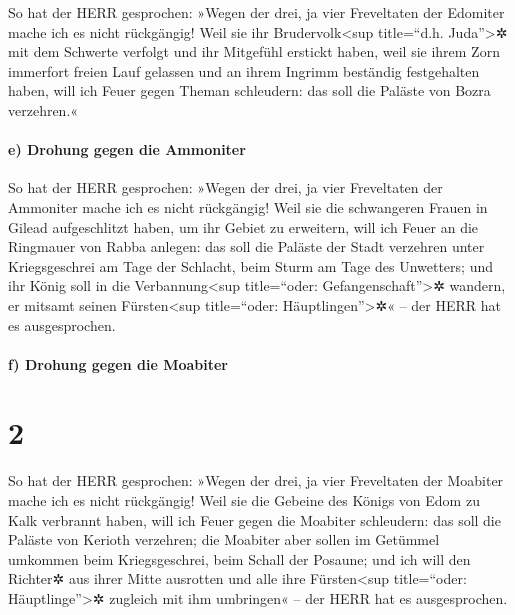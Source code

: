 So hat der HERR gesprochen: »Wegen der drei, ja vier
Freveltaten der Edomiter mache ich es nicht rückgängig! Weil sie ihr
Brudervolk\textless sup title=``d.h. Juda''\textgreater✲ mit dem
Schwerte verfolgt und ihr Mitgefühl erstickt haben, weil sie ihrem Zorn
immerfort freien Lauf gelassen und an ihrem Ingrimm beständig
festgehalten haben, will ich Feuer gegen Theman
schleudern: das soll die Paläste von Bozra verzehren.«

\hypertarget{e-drohung-gegen-die-ammoniter}{%
\paragraph{e) Drohung gegen die
Ammoniter}\label{e-drohung-gegen-die-ammoniter}}

So hat der HERR gesprochen: »Wegen der drei, ja vier
Freveltaten der Ammoniter mache ich es nicht rückgängig! Weil sie die
schwangeren Frauen in Gilead aufgeschlitzt haben, um ihr Gebiet zu
erweitern, will ich Feuer an die Ringmauer von Rabba
anlegen: das soll die Paläste der Stadt verzehren unter Kriegsgeschrei
am Tage der Schlacht, beim Sturm am Tage des Unwetters;
und ihr König soll in die Verbannung\textless sup
title=``oder: Gefangenschaft''\textgreater✲ wandern, er mitsamt seinen
Fürsten\textless sup title=``oder: Häuptlingen''\textgreater✲« -- der
HERR hat es ausgesprochen.

\hypertarget{f-drohung-gegen-die-moabiter}{%
\paragraph{f) Drohung gegen die
Moabiter}\label{f-drohung-gegen-die-moabiter}}

\hypertarget{section-1}{%
\section{2}\label{section-1}}

So hat der HERR gesprochen: »Wegen der drei, ja vier
Freveltaten der Moabiter mache ich es nicht rückgängig! Weil sie die
Gebeine des Königs von Edom zu Kalk verbrannt haben, will
ich Feuer gegen die Moabiter schleudern: das soll die Paläste von
Kerioth verzehren; die Moabiter aber sollen im Getümmel umkommen beim
Kriegsgeschrei, beim Schall der Posaune; und ich will den
Richter✲ aus ihrer Mitte ausrotten und alle ihre Fürsten\textless sup
title=``oder: Häuptlinge''\textgreater✲ zugleich mit ihm umbringen« --
der HERR hat es ausgesprochen.

